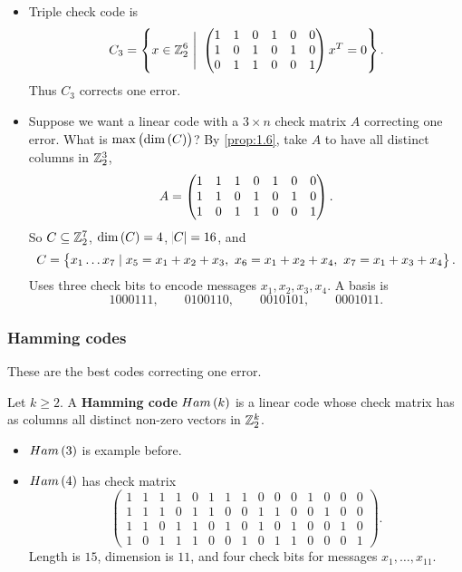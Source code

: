 \begin{example*}
\hfill
\begin{itemize}
\item Triple check code is
$$ C_3 = \cbr{x \in \Z_2^6 \ \Bigg| \ \threebythree{1 & 1}{0 & 1}{0 & 0}{1 & 0}{1 & 0}{1 & 0}{0 & 1}{1 & 0}{0 & 1}x^T = 0}. $$
Thus $ C_3 $ corrects one error.
\item Suppose we want a linear code with a $ 3 \times n $ check matrix $ A $ correcting one error. What is $ \max\br{\dim\br{C}} $? By \ref{prop:1.6}, take $ A $ to have all distinct columns in $ \mathbb{Z}_2^3 $,
$$ A = \begin{pmatrix} 1 & 1 & 1 & 0 & 1 & 0 & 0 \\ 1 & 1 & 0 & 1 & 0 & 1 & 0 \\ 1 & 0 & 1 & 1 & 0 & 0 & 1 \end{pmatrix}. $$
So $ C \subseteq \mathbb{Z}_2^7 $, $ \dim\br{C} = 4 $, $ \abs{C} = 16 $, and
$$ C = \cbr{x_1 \dots x_7 \mid x_5 = x_1 + x_2 + x_3, \ x_6 = x_1 + x_2 + x_4, \ x_7 = x_1 + x_3 + x_4}. $$
Uses three check bits to encode messages $ x_1, x_2, x_3, x_4 $. A basis is
$$ 1000111, \qquad 0100110, \qquad 0010101, \qquad 0001011. $$
\end{itemize}
\end{example*}

\pagebreak

\subsubsection{Hamming codes}


These are the best codes correcting one error.

\begin{definition*}
Let $ k \ge 2 $. A \textbf{Hamming code} $ Ham\br{k} $ is a linear code whose check matrix has as columns all distinct non-zero vectors in $ \mathbb{Z}_2^k $.
\end{definition*}

\setcounter{MaxMatrixCols}{15}

\begin{example*}
\hfill
\begin{itemize}
\item $ Ham\br{3} $ is example before.
\item $ Ham\br{4} $ has check matrix
$$
\begin{pmatrix}
1 & 1 & 1 & 1 & 0 & 1 & 1 & 1 & 0 & 0 & 0 & 1 & 0 & 0 & 0 \\
1 & 1 & 1 & 0 & 1 & 1 & 0 & 0 & 1 & 1 & 0 & 0 & 1 & 0 & 0 \\
1 & 1 & 0 & 1 & 1 & 0 & 1 & 0 & 1 & 0 & 1 & 0 & 0 & 1 & 0 \\
1 & 0 & 1 & 1 & 1 & 0 & 0 & 1 & 0 & 1 & 1 & 0 & 0 & 0 & 1
\end{pmatrix}.
$$
Length is $ 15 $, dimension is $ 11 $, and four check bits for messages $ x_1, \dots, x_{11} $.
\end{itemize}
\end{example*}

